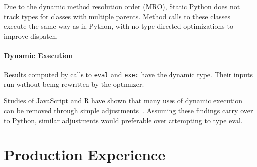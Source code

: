\documentclass[english,cleveref,submission]{programming}
\newcommand{\SP}{Static Python}
\newcommand{\code}[1]{\texttt{#1}}
\begin{document}
Due to the dynamic method resolution order (MRO),
\SP{} does not track types for classes with multiple parents.
Method calls to these classes execute the same way as
in Python, with no type-directed optimizations to improve dispatch.


\paragraph{Dynamic Execution}


Results computed by calls to \code{eval} and \code{exec}
have the dynamic type.
Their inputs run without being rewritten by the optimizer.

Studies of JavaScript and R have shown that many uses of dynamic execution
can be removed through simple adjustments~\cite{rhbv-ecoop-2011,gdkkv-oopsla-2021,mrmv-esop-2012}.
Assuming these findings carry over to Python, similar adjustments would
preferable over attempting to type eval.






\section{Production Experience}
\label{s:eval}
\end{document}
